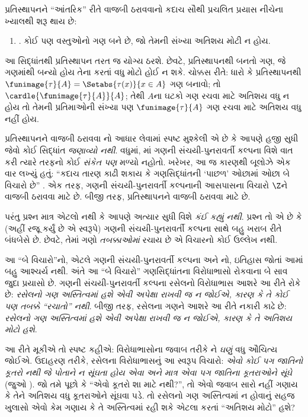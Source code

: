 \begingroup
\makeatletter{}\makeatother

\label{guunit:OLP-0569}


પ્રતિસ્થાપનને ``આંતરિક'' રીતે વાજબી ઠરાવવાનો કદાચ સૌથી
પ્રચલિત પ્રયાસ નીચેના ખ્યાલથી શરૂ થાય છે:
\begin{enumerate}
	\item[] \limofsize. કોઈ પણ વસ્તુઓનો ગણ બને છે,
	જો તેમની સંખ્યા અતિશય મોટી ન હોય.
\end{enumerate}
આ સિદ્ધાંતથી પ્રતિસ્થાપન તરત જ યોગ્ય ઠરશે. છેવટે,
પ્રતિસ્થાપનથી બનતો ગણ, જે ગણમાંથી બન્યો હોય તેના કરતાં
વધુ મોટો હોઈ ન શકે. ચોક્કસ રીતે: ધારો કે પ્રતિસ્થાપનથી
$\funimage{\tau}{A} = \Setabs{\tau(x)}{x \in A}$ ગણ
બનાવો; તો $\cardle{\funimage{\tau}{A}}{A}$; તેથી $A$ના
ઘટકો ગણ રચવા માટે અતિશય વધુ ન હોય તો તેમની
પ્રતિમાઓની સંખ્યા પણ $\funimage{\tau}{A}$ ગણ રચવા
માટે અતિશય વધુ નહીં હોય.

પ્રતિસ્થાપનને વાજબી ઠરાવવા \limofsize{}નો આધાર
લેવામાં સ્પષ્ટ મુશ્કેલી એ છે કે આપણે હજી સુધી
\limofsize{} જેવો કોઈ સિદ્ધાંત \emph{જણાવ્યો નથી}.
વધુમાં, માં
ગણની સંચયી-પુનરાવર્તી કલ્પના વિશે વાત કરી ત્યારે
\limofsize{} તરફનો કોઈ \emph{સંકેત પણ} મળ્યો નહોતો.
ખરેખર, આ જ કારણથી બૂલોઝે એક વાર લખ્યું હતું:
``કદાચ તારણ કાઢી શકાય કે ગણસિદ્ધાંતની `પાછળ' ઓછામાં
ઓછા બે વિચારો છે'' \citeyearpar[p.~19]{Boolos1989}.
એક તરફ, ગણની સંચયી-પુનરાવર્તી કલ્પનાની આસપાસના
વિચારો $\Z$ને વાજબી ઠરાવવા માટે છે. બીજી તરફ,
\limofsize{} પ્રતિસ્થાપનને વાજબી ઠરાવવા માટે છે.

પરંતુ પ્રશ્ન માત્ર એટલો નથી કે આપણે અત્યાર સુધી
\limofsize{} વિશે \emph{કંઈ કહ્યું નથી}. પ્રશ્ન તો
એ છે કે \limofsize{} (અહીં રજૂ કર્યું છે એ સ્વરૂપે)
ગણની સંચયી-પુનરાવર્તી કલ્પના સાથે બહુ ખરાબ રીતે
બંધબેસે છે. છેવટે, તેમાં ગણો \emph{તબક્કાઓમાં}
રચાય છે એ વિચારનો કોઈ ઉલ્લેખ નથી.

આ ``બે વિચારો''નો, એટલે ગણની સંચયી-પુનરાવર્તી
કલ્પના અને \limofsize{}નો, ઇતિહાસ જોતાં આમાં
બહુ આશ્ચર્ય નથી. અંતે આ ``બે વિચારો'' ગણસિદ્ધાંતના
વિરોધાભાસો રોકવાના બે સાવ જુદા પ્રયાસો છે.
ગણની સંચયી-પુનરાવર્તી કલ્પના રસેલનો વિરોધાભાસ
આશરે આ રીતે રોકે છે: \emph{રસેલનો ગણ અસ્તિત્વમાં હશે
એવી અપેક્ષા રાખવી જ ન જોઈએ, કારણ કે તે કોઈ પણ
તબક્કે ``રચાતો'' નથી}. બીજી તરફ, \limofsize{}
રસેલના ગણને આશરે આ રીતે નકારી કાઢે છે:
\emph{રસેલનો ગણ અસ્તિત્વમાં હશે એવી અપેક્ષા રાખવી જ
ન જોઈએ, કારણ કે તે અતિશય મોટો હશે}.

આ રીતે મૂકીએ તો સ્પષ્ટ કહીએ: વિરોધાભાસોના જવાબ તરીકે
\limofsize{}ને \emph{ઘણું} વધુ ઔચિત્ય જોઈએ. ઉદાહરણ
તરીકે, રસેલના વિરોધાભાસનું આ સ્વરૂપ વિચારો:
\emph{એવો કોઈ પગ જાતિનો કૂતરો નથી જે પોતાને ન સૂંઘતા
હોય એવા અને માત્ર એવા પગ જાતિના કૂતરાઓને સૂંઘે}
(જુઓ ). જો તમે પૂછો કે
``એવો કૂતરો શા માટે નથી?'', તો એવો જવાબ સારો નહીં ગણાય
કે તેને અતિશય વધુ કૂતરાઓને સૂંઘવા પડે. તો રસેલનો
ગણ અસ્તિત્વમાં ન હોવાનું સહજ ખુલાસો એવો કેમ ગણાય કે
તે અસ્તિત્વમાં રહી શકે એટલા કરતાં ``અતિશય મોટો'' હશે?

